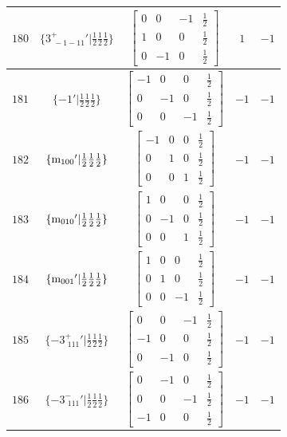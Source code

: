 \documentclass[fleqn,8pt]{jsarticle}
\begin{document}
\begin{longtable}{ccccc}
$ 180 $ & $ \{3^{+}_{\,\,-1-11}{}'|\frac{1}{2} \frac{1}{2} \frac{1}{2}\} $ & $ \begin{bmatrix} 0 & 0 & -1 & \frac{1}{2} \\ 1 & 0 & 0 & \frac{1}{2} \\ 0 & -1 & 0 & \frac{1}{2} \end{bmatrix} $ & $ 1 $ & $ -1 $ \\ \hline
$ 181 $ & $ \{-1{}'|\frac{1}{2} \frac{1}{2} \frac{1}{2}\} $ & $ \begin{bmatrix} -1 & 0 & 0 & \frac{1}{2} \\ 0 & -1 & 0 & \frac{1}{2} \\ 0 & 0 & -1 & \frac{1}{2} \end{bmatrix} $ & $ -1 $ & $ -1 $ \\ \hline
$ 182 $ & $ \{{\rm m}_{100}{}'|\frac{1}{2} \frac{1}{2} \frac{1}{2}\} $ & $ \begin{bmatrix} -1 & 0 & 0 & \frac{1}{2} \\ 0 & 1 & 0 & \frac{1}{2} \\ 0 & 0 & 1 & \frac{1}{2} \end{bmatrix} $ & $ -1 $ & $ -1 $ \\ \hline
$ 183 $ & $ \{{\rm m}_{010}{}'|\frac{1}{2} \frac{1}{2} \frac{1}{2}\} $ & $ \begin{bmatrix} 1 & 0 & 0 & \frac{1}{2} \\ 0 & -1 & 0 & \frac{1}{2} \\ 0 & 0 & 1 & \frac{1}{2} \end{bmatrix} $ & $ -1 $ & $ -1 $ \\ \hline
$ 184 $ & $ \{{\rm m}_{001}{}'|\frac{1}{2} \frac{1}{2} \frac{1}{2}\} $ & $ \begin{bmatrix} 1 & 0 & 0 & \frac{1}{2} \\ 0 & 1 & 0 & \frac{1}{2} \\ 0 & 0 & -1 & \frac{1}{2} \end{bmatrix} $ & $ -1 $ & $ -1 $ \\ \hline
$ 185 $ & $ \{-3^{+}_{\,\,111}{}'|\frac{1}{2} \frac{1}{2} \frac{1}{2}\} $ & $ \begin{bmatrix} 0 & 0 & -1 & \frac{1}{2} \\ -1 & 0 & 0 & \frac{1}{2} \\ 0 & -1 & 0 & \frac{1}{2} \end{bmatrix} $ & $ -1 $ & $ -1 $ \\ \hline
$ 186 $ & $ \{-3^{-}_{\,\,111}{}'|\frac{1}{2} \frac{1}{2} \frac{1}{2}\} $ & $ \begin{bmatrix} 0 & -1 & 0 & \frac{1}{2} \\ 0 & 0 & -1 & \frac{1}{2} \\ -1 & 0 & 0 & \frac{1}{2} \end{bmatrix} $ & $ -1 $ & $ -1 $ \\ \hline

\end{longtable}
\end{document}
